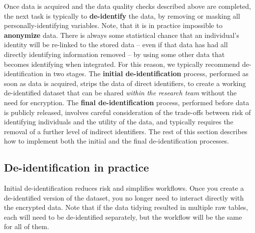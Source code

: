 Once data is acquired and the data quality checks described above are completed,
the next task is typically to \textbf{de-identify} the data,
by removing or masking all personally-identifying variables.
Note, that it is in practice impossible to \textbf{anonymize} data.
There is always some statistical chance that an individual's identity
will be re-linked to the stored data
-- even if that data has had all directly identifying information removed --
by using some other data that becomes identifying when integrated.
For this reason, we typically recommend de-identification in two stages.
The \textbf{initial de-identification} process, 
performed as soon as data is acquired, strips the data of direct identifiers,
to create a working de-identified dataset that
can be shared \textit{within the research team} without the need for encryption.
The \textbf{final de-identification} process,
performed before data is publicly released, involves
careful consideration of the trade-offs between
risk of identifying individuals and the utility of the data,
and typically requires the removal of a further level of indirect identifiers.
The rest of this section describes how to implement 
both the initial and the final de-identification processes.


\subsection{De-identification in practice}

Initial de-identification reduces risk and simplifies workflows.
Once you create a de-identified version of the dataset,
you no longer need to interact directly with the encrypted data.
Note that if the data tidying resulted in multiple raw tables,
each will need to be de-identified separately, but
the workflow will be the same for all of them.

